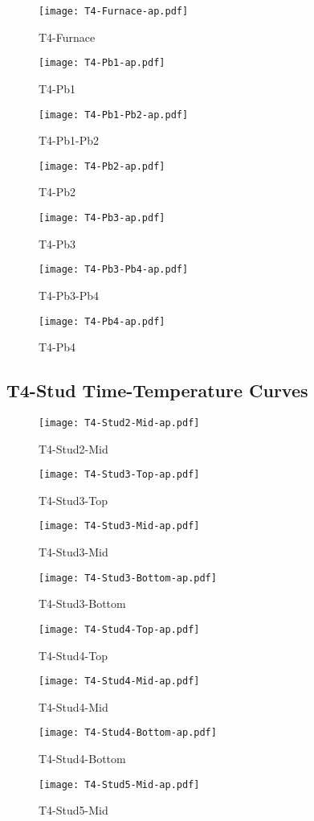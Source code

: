 \begin{figure}[htbp]
\centering
	\texttt{[image: T4-Furnace-ap.pdf]}
	\caption*{T4-Furnace}
\end{figure}
\begin{figure}[htbp]
	\centering
		\texttt{[image: T4-Pb1-ap.pdf]}
		\caption*{T4-Pb1}
\end{figure}
\begin{figure}[htbp]
	\centering
		\texttt{[image: T4-Pb1-Pb2-ap.pdf]}
		\caption*{T4-Pb1-Pb2}
\end{figure}
\begin{figure}[htbp]
	\centering
		\texttt{[image: T4-Pb2-ap.pdf]}
		\caption*{T4-Pb2}
\end{figure}
\begin{figure}[htbp]
	\centering
		\texttt{[image: T4-Pb3-ap.pdf]}
		\caption*{T4-Pb3}
\end{figure}
\begin{figure}[htbp]
	\centering
			\texttt{[image: T4-Pb3-Pb4-ap.pdf]}
			\caption*{T4-Pb3-Pb4}
\end{figure}
\begin{figure}[htbp]
	\centering
			\texttt{[image: T4-Pb4-ap.pdf]}
			\caption*{T4-Pb4}
\end{figure}

\pagebreak

\subsection*{T4-Stud Time-Temperature Curves}

\begin{figure}[htbp]
	\centering
			\texttt{[image: T4-Stud2-Mid-ap.pdf]}
			\caption*{T4-Stud2-Mid}
\end{figure}
\begin{figure}[htbp]
	\centering
			\texttt{[image: T4-Stud3-Top-ap.pdf]}
			\caption*{T4-Stud3-Top}
\end{figure}
\begin{figure}[htbp]
	\centering
			\texttt{[image: T4-Stud3-Mid-ap.pdf]}
			\caption*{T4-Stud3-Mid}
\end{figure}
\begin{figure}[htbp]
	\centering
			\texttt{[image: T4-Stud3-Bottom-ap.pdf]}
			\caption*{T4-Stud3-Bottom}
\end{figure}
\begin{figure}[htbp]
	\centering
			\texttt{[image: T4-Stud4-Top-ap.pdf]}
			\caption*{T4-Stud4-Top}
\end{figure}
\begin{figure}[htbp]
	\centering
			\texttt{[image: T4-Stud4-Mid-ap.pdf]}
			\caption*{T4-Stud4-Mid}
\end{figure}
\begin{figure}[htbp]
	\centering
			\texttt{[image: T4-Stud4-Bottom-ap.pdf]}
			\caption*{T4-Stud4-Bottom}
\end{figure}
\begin{figure}[htbp]
	\centering
			\texttt{[image: T4-Stud5-Mid-ap.pdf]}
			\caption*{T4-Stud5-Mid}
\end{figure}

